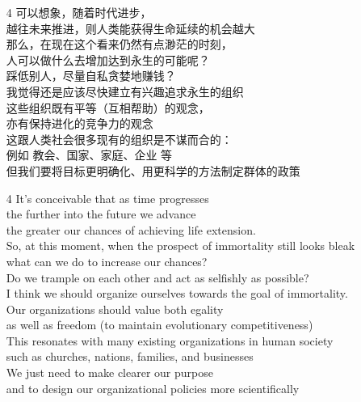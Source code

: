 \begin{itemize}
	\item[4] 可以想象，随着时代进步， \\
	越往未来推进，则人类能获得生命延续的机会越大 \\
	那么，在现在这个看来仍然有点渺茫的时刻， \\
	人可以做什么去增加达到永生的可能呢？ \\
	踩低别人，尽量自私贪婪地赚钱？ \\
	我觉得还是应该尽快建立有兴趣追求永生的组织 \\
	这些组织既有平等（互相帮助）的观念， \\
	亦有保持进化的竞争力的观念 \\
	这跟人类社会很多现有的组织是不谋而合的： \\
	例如 教会、国家、家庭、企业 等 \\
	但我们要将目标更明确化、用更科学的方法制定群体的政策

	\item[4] It's conceivable that as time progresses \\
	the further into the future we advance \\
	the greater our chances of achieving life extension. \\
	So, at this moment, when the prospect of immortality still looks bleak \\
	what can we do to increase our chances? \\
	Do we trample on each other and act as selfishly as possible? \\
	I think we should organize ourselves towards the goal of immortality. \\
	Our organizations should value both egality \\
	as well as freedom (to maintain evolutionary competitiveness) \\
	This resonates with many existing organizations in human society \\
	such as churches, nations, families, and businesses \\
	We just need to make clearer our purpose \\
	and to design our organizational policies more scientifically

\end{itemize}


